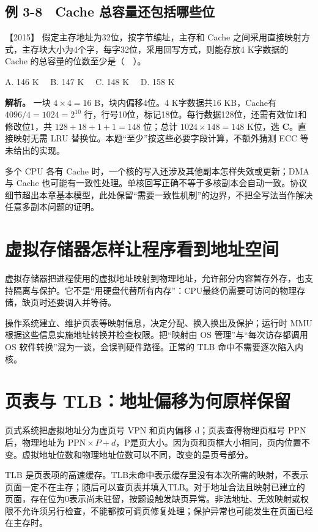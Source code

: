 \subsection{例 3-8　Cache 总容量还包括哪些位}\label{co-ex3-8}

\noindent{}【2015】 假定主存地址为32位，按字节编址，主存和 Cache 之间采用直接映射方式，主存块大小为4个字，每字32位，采用回写方式，则能存放4 K字数据的 Cache 的总容量的位数至少是（　）。

A. 146 K　 B. 147 K　 C. 148 K　 D. 158 K


\textbf{解析。} 一块 \(4\times4=16\) B，块内偏移4位。4 K字数据共16 KB，Cache有 \(4096/4=1024=2^{10}\) 行，行号10位，标记18位。每行数据128位，还需有效位1和修改位1，共 \(128+18+1+1=148\) 位；总计 \(1024\times148=148\) K位，选 \textbf{C}。直接映射无需 LRU 替换位。本题``至少''按这些必要字段计算，不额外猜测 ECC 等未给出的实现。

多个 CPU 各有 Cache 时，一个核的写入还涉及其他副本怎样失效或更新；DMA 与 Cache 也可能有一致性处理。单核回写正确不等于多核副本会自动一致。协议细节超出本章基本模型，此处保留``需要一致性机制''的边界，不把全写法当作解决任意多副本问题的证明。

\section{虚拟存储器怎样让程序看到地址空间}\label{co-03-11}

虚拟存储器把进程使用的虚拟地址映射到物理地址，允许部分内容暂存外存，也支持隔离与保护。它不是``用硬盘代替所有内存''：CPU最终仍需要可访问的物理存储，缺页时还要调入并等待。

操作系统建立、维护页表等映射信息，决定分配、换入换出及保护；运行时 MMU 根据这些信息实施地址转换并检查权限。把``映射由 OS 管理''与``每次访存都调用 OS 软件转换''混为一谈，会误判硬件路径。正常的 TLB 命中不需要逐次陷入内核。

\section{页表与 TLB：地址偏移为何原样保留}\label{co-03-12}

页式系统把虚拟地址分为虚页号 VPN 和页内偏移 d；页表查得物理页框号 PPN 后，物理地址为 \(\mathrm{PPN}\times P+d\)，P是页大小。因为页和页框大小相同，页内位置不变。虚拟地址位数和物理地址位数可以不同，改变的是页号部分。

TLB 是页表项的高速缓存。TLB未命中表示缓存里没有本次所需的映射，不表示页面一定不在主存；随后可以查页表并填入TLB。对于地址合法且映射已建立的页面，存在位为0表示尚未驻留，按题设触发缺页异常。非法地址、无效映射或权限不允许须另行检查，不能都按可调页修复处理；保护异常也可能发生在页面已经在主存时。

